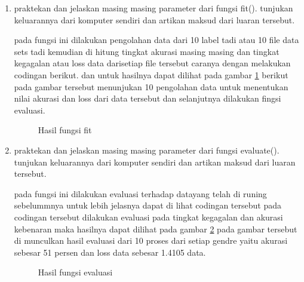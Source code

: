 \begin{enumerate}
\item praktekan dan jelaskan masing masing parameter dari fungsi fit().  tunjukan keluarannya dari komputer sendiri dan artikan maksud dari luaran tersebut.\par
\subitem pada fungsi ini dilakukan pengolahan data dari 10 label tadi atau 10 file data sets tadi kemudian di hitung tingkat akurasi masing masing dan tingkat kegagalan atau loss data darisetiap file tersebut caranya dengan melakukan codingan berikut. dan untuk hasilnya dapat dilihat pada gambar \ref{c128} berikut pada gambar tersebut menunjukan 10 pengolahan data untuk menentukan nilai akurasi dan loss dari data tersebut dan selanjutnya dilakukan fingsi evaluasi.



\begin{figure}[!htbp]
      \caption{Hasil fungsi fit}
      \label{c128}
      \end{figure}

\item praktekan dan jelaskan masing masing parameter dari fungsi evaluate().  tunjukan keluarannya dari komputer sendiri dan artikan maksud dari luaran tersebut.\par
\subitem pada fungsi ini dilakukan evaluasi terhadap datayang telah di runing sebelummnya untuk lebih jelasnya dapat di lihat codingan tersebut  pada codingan tersebut dilakukan evaluasi pada tingkat kegagalan dan akurasi kebenaran maka hasilnya dapat dilihat pada gambar \ref{c129} pada gambar tersebut di munculkan hasil evaluasi dari 10 proses dari setiap gendre yaitu akurasi sebesar 51 persen dan loss data sebesar 1.4105 data.



\begin{figure}[!htbp]
      \caption{Hasil fungsi evaluasi}
      \label{c129}
      \end{figure}


\end{enumerate}
